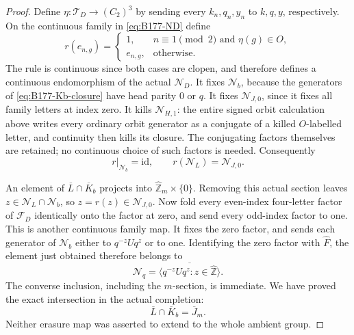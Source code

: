 \begin{proof}
Define \(\eta:\mathcal T_D\to(C_2)^3\) by sending every
\(k_n,q_n,y_n\) to \(k,q,y\), respectively. On the continuous
family in \eqref{eq:B177-ND} define
\begin{equation}\label{eq:B177-erasure}
 r(e_{n,g})=
 \begin{cases}
  1,& n\equiv1\pmod2\text{ and }\eta(g)\in O,\\
  e_{n,g},&\text{otherwise}.
 \end{cases}
\end{equation}
The rule is continuous since both cases are clopen, and therefore
defines a continuous endomorphism of the actual \(\mathcal N_D\).
It fixes \(\mathcal N_b\), because the generators of
\eqref{eq:B177-Kb-closure} have head parity \(0\) or \(q\).
It fixes \(\mathcal N_{J,0}\), since it fixes all family letters
at index zero. It kills \(\mathcal N_{H,1}\): the entire signed
orbit calculation above writes every ordinary orbit generator as a
conjugate of a killed \(O\)-labelled letter, and continuity then
kills its closure. The conjugating factors themselves are retained;
no continuous choice of such factors is needed. Consequently
\[
 r|_{\mathcal N_b}=\mathrm{id},\qquad
                    r(\mathcal N_L)=\mathcal N_{J,0}.
\]

An element of \(\overline L\cap\overline K_b\) projects into
\(\widehat{\mathbb Z}_m\times\{0\}\). Removing this actual
section leaves \(z\in\mathcal N_L\cap\mathcal N_b\), so
\(z=r(z)\in\mathcal N_{J,0}\).
Now fold every even-index four-letter factor of \(\mathcal F_D\)
identically onto the factor at zero, and send every odd-index
factor to one. This is another continuous family map. It fixes the
zero factor, and sends each generator of \(\mathcal N_b\) either
to \(q^{-z}Uq^z\) or to one. Identifying the zero factor with
\(\widehat F\), the element just obtained therefore belongs to
\[
 \mathcal N_q=
     \overline{\langle q^{-z}Uq^z:z\in\widehat{\mathbb Z}\rangle}.
\]
The converse inclusion, including the \(m\)-section, is immediate.
We have proved the exact intersection in the actual completion:
\begin{equation}\label{eq:B177-LKb-compact}
                   \overline L\cap\overline K_b=\overline J_m.
\end{equation}
Neither erasure map was asserted to extend to the whole ambient group.


\end{proof}
